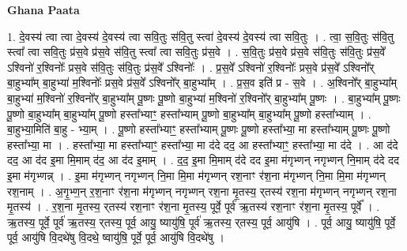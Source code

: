 \documentclass[17pt]{extarticle}
\begin{document}
\textbf{Ghana Paata } \newline

1. दे॒वस्य॑ त्वा त्वा दे॒वस्य॑ दे॒वस्य॑ त्वा सवि॒तुः स॑वि॒तु स्त्वा॑ दे॒वस्य॑ दे॒वस्य॑ त्वा सवि॒तुः । . त्वा॒ स॒वि॒तुः स॑वि॒तु स्त्वा᳚ त्वा सवि॒तुः प्र॑स॒वे प्र॑स॒वे स॑वि॒तु स्त्वा᳚ त्वा सवि॒तुः प्र॑स॒वे । . स॒वि॒तुः प्र॑स॒वे प्र॑स॒वे स॑वि॒तुः स॑वि॒तुः प्र॑स॒वे᳚ ऽश्विनो॑ र॒श्विनोः᳚ प्रस॒वे स॑वि॒तुः स॑वि॒तुः प्र॑स॒वे᳚ ऽश्विनोः᳚ । . प्र॒स॒वे᳚ ऽश्विनो॑ र॒श्विनोः᳚ प्रस॒वे प्र॑स॒वे᳚ ऽश्विनो᳚र् बा॒हुभ्या᳚म् बा॒हुभ्या॑ म॒श्विनोः᳚ प्रस॒वे प्र॑स॒वे᳚ ऽश्विनो᳚र् बा॒हुभ्या᳚म् । . प्र॒स॒व इति॑ प्र - स॒वे । . अ॒श्विनो᳚र् बा॒हुभ्या᳚म् बा॒हुभ्या॑ म॒श्विनो॑ र॒श्विनो᳚र् बा॒हुभ्या᳚म् पू॒ष्णः पू॒ष्णो बा॒हुभ्या॑ म॒श्विनो॑ र॒श्विनो᳚र् बा॒हुभ्या᳚म् पू॒ष्णः । . बा॒हुभ्या᳚म् पू॒ष्णः पू॒ष्णो बा॒हुभ्या᳚म् बा॒हुभ्या᳚म् पू॒ष्णो हस्ता᳚भ्याꣳ॒॒ हस्ता᳚भ्याम् पू॒ष्णो बा॒हुभ्या᳚म् बा॒हुभ्या᳚म् पू॒ष्णो हस्ता᳚भ्याम् । . बा॒हुभ्या॒मिति॑ बा॒हु - भ्या॒म् । . पू॒ष्णो हस्ता᳚भ्याꣳ॒॒ हस्ता᳚भ्याम् पू॒ष्णः पू॒ष्णो हस्ता᳚भ्या॒ मा हस्ता᳚भ्याम् पू॒ष्णः पू॒ष्णो हस्ता᳚भ्या॒ मा । . हस्ता᳚भ्या॒ मा हस्ता᳚भ्याꣳ॒॒ हस्ता᳚भ्या॒ मा द॑दे दद॒ आ हस्ता᳚भ्याꣳ॒॒ हस्ता᳚भ्या॒ मा द॑दे । . आ द॑दे दद॒ आ द॑द इ॒मा मि॒माम् द॑द॒ आ द॑द इ॒माम् । . द॒द॒ इ॒मा मि॒माम् द॑दे दद इ॒मा म॑गृभ्णन् नगृभ्णन् नि॒माम् द॑दे दद इ॒मा म॑गृभ्णन्न् । . इ॒मा म॑गृभ्णन् नगृभ्णन् नि॒मा मि॒मा म॑गृभ्णन् रश॒नाꣳ र॑श॒ना म॑गृभ्णन् नि॒मा मि॒मा म॑गृभ्णन् रश॒नाम् । . अ॒गृ॒भ्ण॒न् र॒श॒नाꣳ र॑श॒ना म॑गृभ्णन् नगृभ्णन् रश॒ना मृ॒तस्य॒ र्‌तस्य॑ रश॒ना म॑गृभ्णन् नगृभ्णन् रश॒ना मृ॒तस्य॑ । . र॒श॒ना मृ॒तस्य॒ र्‌तस्य॑ रश॒नाꣳ र॑श॒ना मृ॒तस्य॒ पूर्वे॒ पूर्व॑ ऋ॒तस्य॑ रश॒नाꣳ र॑श॒ना मृ॒तस्य॒ पूर्वे᳚ । . ऋ॒तस्य॒ पूर्वे॒ पूर्व॑ ऋ॒तस्य॒ र्‌तस्य॒ पूर्व॒ आयु॒ ष्यायु॑षि॒ पूर्व॑ ऋ॒तस्य॒ र्‌तस्य॒ पूर्व॒ आयु॑षि । . पूर्व॒ आयु॒ ष्यायु॑षि॒ पूर्वे॒ पूर्व॒ आयु॑षि वि॒दथे॑षु वि॒दथे॒ ष्वायु॑षि॒ पूर्वे॒ पूर्व॒ आयु॑षि वि॒दथे॑षु । \newline
\end{document}
